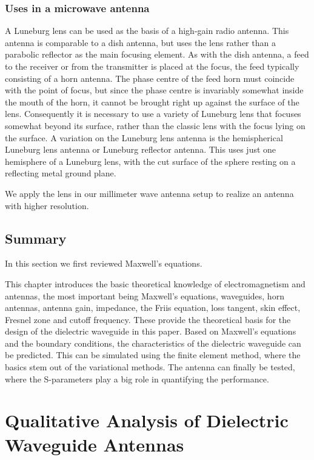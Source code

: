 \documentclass[a4paper,12pt]{report}
\begin{document}
\subsection{Uses in a microwave antenna}

A Luneburg lens can be used as the basis of a high-gain radio antenna.
This antenna is comparable to a dish antenna,
but uses the lens rather than a parabolic reflector as the main focusing element.
As with the dish antenna,
a feed to the receiver or from the transmitter is placed at the focus,
the feed typically consisting of a horn antenna.
The phase centre of the feed horn must coincide with the point of focus,
but since the phase centre is invariably somewhat inside the mouth of the horn,
it cannot be brought right up against the surface of the lens.
Consequently it is necessary to use a variety of Luneburg lens
that focuses somewhat beyond its surface,
rather than the classic lens with the focus lying on the surface.
A variation on the Luneburg lens antenna is the hemispherical
Luneburg lens antenna or Luneburg reflector antenna.
This uses just one hemisphere of a Luneburg lens,
with the cut surface of the sphere resting on a reflecting metal ground plane.

We apply the lens in our millimeter wave antenna setup to
realize an antenna with higher resolution.

\section{Summary}

In this section we first reviewed Maxwell's equations.

This chapter introduces the basic theoretical knowledge
of electromagnetism and antennas,
the most important being Maxwell's equations, waveguides, horn antennas,
antenna gain, impedance, the Friis equation, loss tangent,
skin effect, Fresnel zone and cutoff frequency.
These provide the theoretical basis for the design
of the dielectric waveguide in this paper.
Based on
Maxwell's equations and the boundary conditions,
the characteristics of the dielectric waveguide can be predicted.
This can be simulated using the finite element method,
where the basics stem out of the variational methods.
The antenna can finally be tested,
where the S-parameters play a big role in
quantifying the performance.

\chapter{Qualitative Analysis of Dielectric Waveguide Antennas}
\end{document}
